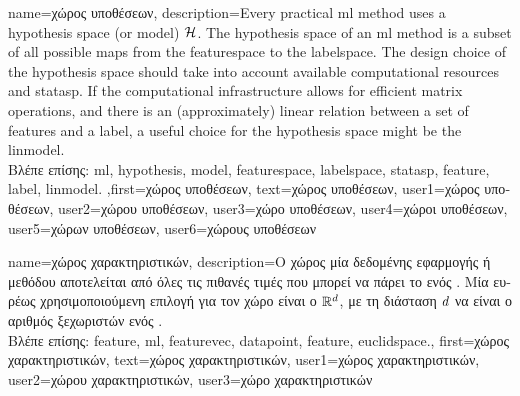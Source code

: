 {name={\foreignlanguage{greek}{χώρος υποθέσεων}}, 
	description={Every 
		practical \gls{ml} method uses a \gls{hypothesis} space (or \gls{model}) $\mathcal{H}$. The \gls{hypothesis} space 
		of an \gls{ml} method is a subset of all possible maps from the \gls{featurespace} to the \gls{labelspace}. 
		The design choice of the \gls{hypothesis} space should take into account available computational resources and 
		\gls{statasp}. If the computational infrastructure allows for efficient matrix operations, and there 
		is an (approximately) linear relation between a set of \gls{feature}s and a \gls{label}, a useful choice for the 
		\gls{hypothesis} space might be the \gls{linmodel}.\\
		\foreignlanguage{greek}{Βλέπε επίσης:} \gls{ml}, \gls{hypothesis}, \gls{model}, \gls{featurespace}, \gls{labelspace}, \gls{statasp}, \gls{feature}, \gls{label}, \gls{linmodel}.
		},first={\foreignlanguage{greek}{χώρος υποθέσεων}},
		text={\foreignlanguage{greek}{χώρος υποθέσεων}}, 
		user1={\foreignlanguage{greek}{χώρος υποθέσεων}}, %
		user2={\foreignlanguage{greek}{χώρου υποθέσεων}}, %
		user3={\foreignlanguage{greek}{χώρο υποθέσεων}}, %
		user4={\foreignlanguage{greek}{χώροι υποθέσεων}}, %
		user5={\foreignlanguage{greek}{χώρων υποθέσεων}}, %
		user6={\foreignlanguage{greek}{χώρους υποθέσεων}} %
}

{name={\foreignlanguage{greek}{χώρος χαρακτηριστικών}},
	description={\foreignlanguage{greek}{Ο χώρος}  
		\foreignlanguage{greek}{μία δεδομένης εφαρμογής ή μεθόδου}  \foreignlanguage{greek}{αποτελείται από 
		όλες τις πιθανές τιμές που μπορεί να πάρει το}  \foreignlanguage{greek}{ενός} . 
		\foreignlanguage{greek}{Μία ευρέως χρησιμοποιούμενη επιλογή για τον χώρο}  
		\foreignlanguage{greek}{είναι ο}  $\mathbb{R}^{d}$, 
		\foreignlanguage{greek}{με τη διάσταση $d$ να είναι ο αριθμός ξεχωριστών}  
		\foreignlanguage{greek}{ενός} .\\
		\foreignlanguage{greek}{Βλέπε επίσης:} \gls{feature}, \gls{ml}, \gls{featurevec}, \gls{datapoint}, \gls{feature}, \gls{euclidspace}.},
	first={\foreignlanguage{greek}{χώρος χαρακτηριστικών}},
	text={\foreignlanguage{greek}{χώρος χαρακτηριστικών}},
	user1={\foreignlanguage{greek}{χώρος χαρακτηριστικών}}, %
  	user2={\foreignlanguage{greek}{χώρου χαρακτηριστικών}}, %
	user3={\foreignlanguage{greek}{χώρο χαρακτηριστικών}} %
}

